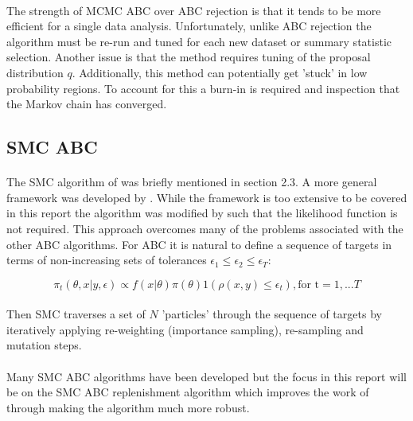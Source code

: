 \documentclass[12,fleqn]{article}
\theoremstyle{definition}
\theoremstyle{plain}
\begin{document}
\paragraph{}
The strength of MCMC ABC over ABC rejection is that it tends to be more efficient for a single data analysis. Unfortunately, unlike ABC rejection the algorithm must be re-run and tuned for each new dataset or summary statistic selection. Another issue is that the method requires tuning of the proposal distribution $q$. Additionally, this method can potentially get 'stuck' in low probability regions. To account for this a burn-in is required and inspection that the Markov chain has converged.
\par

\subsection{SMC ABC}
\paragraph{}
The SMC algorithm of  was briefly mentioned in section 2.3. A more general framework was developed by . While the framework is too extensive to be covered in this report the algorithm was modified by  such that the likelihood function is not required. This approach overcomes many of the problems associated with the other ABC algorithms. For ABC it is natural to define a sequence of targets in terms of non-increasing sets of tolerances $\epsilon_1 \leq \epsilon_2 \leq \epsilon_T$:
\par
\begin{equation*}
\pi_t(\theta, x | y, \epsilon) \propto f(x|\theta)\pi(\theta)1(\rho(x, y) \leq \epsilon_t), \text{for t} = 1,...T
\end{equation*}
\paragraph{}
Then SMC traverses a set of $N$ 'particles' through the sequence of targets by iteratively applying re-weighting (importance sampling), re-sampling and mutation steps.
\par

\paragraph{}
Many SMC ABC algorithms have been developed but the focus in this report will be on the SMC ABC replenishment algorithm  which improves the work of  through making the algorithm much more robust. 
\par
\end{document}

